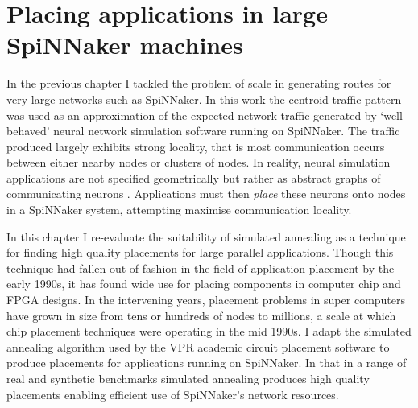 \chapter{Placing applications in large SpiNNaker machines}
	
	In the previous chapter I tackled the problem of scale in generating routes
	for very large networks such as SpiNNaker. In this work the centroid traffic
	pattern was used as an approximation of the expected network traffic
	generated by `well behaved' neural network simulation software running on
	SpiNNaker. The traffic produced largely exhibits strong locality, that is
	most communication occurs between either nearby nodes or clusters of nodes.
	In reality, neural simulation applications are not specified geometrically
	but rather as abstract graphs of communicating neurons
	\cite{davison08,eliasmith13}. Applications must then \emph{place} these
	neurons onto nodes in a SpiNNaker system, attempting maximise communication
	locality.
	
	In this chapter I re-evaluate the suitability of simulated annealing as a
	technique for finding high quality placements for large parallel
	applications. Though this technique had fallen out of fashion in the field of
	application placement by the early 1990s, it has found wide use for placing
	components in computer chip and FPGA designs. In the intervening years,
	placement problems in super computers have grown in size from tens or
	hundreds of nodes to millions, a scale at which chip placement techniques
	were operating in the mid 1990s. I adapt the simulated annealing algorithm
	used by the VPR academic circuit placement software to produce placements for
	applications running on SpiNNaker. In that in a range of real and synthetic
	benchmarks simulated annealing produces high quality placements enabling
	efficient use of SpiNNaker's network resources.
	
	
	
